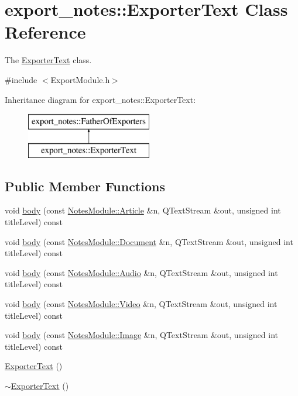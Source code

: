 \hypertarget{classexport__notes_1_1_exporter_text}{\section{export\-\_\-notes\-:\-:Exporter\-Text Class Reference}
\label{classexport__notes_1_1_exporter_text}
}


The \hyperlink{classexport__notes_1_1_exporter_text}{Exporter\-Text} class.  




{\ttfamily \#include $<$Export\-Module.\-h$>$}

Inheritance diagram for export\-\_\-notes\-:\-:Exporter\-Text\-:\begin{figure}[H]
\begin{center}
\leavevmode
\includegraphics[height=2.000000cm]{classexport__notes_1_1_exporter_text}
\end{center}
\end{figure}
\subsection*{Public Member Functions}
\begin{DoxyCompactItemize}
\item 
void \hyperlink{classexport__notes_1_1_exporter_text_a1d486f2dfcae0be28bde9f09038c731b}{body} (const \hyperlink{class_notes_module_1_1_article}{Notes\-Module\-::\-Article} \&n, Q\-Text\-Stream \&out, unsigned int title\-Level) const 
\item 
void \hyperlink{classexport__notes_1_1_exporter_text_a1391dd490d0dc8383579a2b5bcb5ff5a}{body} (const \hyperlink{class_notes_module_1_1_document}{Notes\-Module\-::\-Document} \&n, Q\-Text\-Stream \&out, unsigned int title\-Level) const 
\item 
void \hyperlink{classexport__notes_1_1_exporter_text_a3d39dbf72632b3bde0dd71838e0839bc}{body} (const \hyperlink{class_notes_module_1_1_audio}{Notes\-Module\-::\-Audio} \&n, Q\-Text\-Stream \&out, unsigned int title\-Level) const 
\item 
void \hyperlink{classexport__notes_1_1_exporter_text_a1ce83641a4c40361d7c2abaa420b6ac8}{body} (const \hyperlink{class_notes_module_1_1_video}{Notes\-Module\-::\-Video} \&n, Q\-Text\-Stream \&out, unsigned int title\-Level) const 
\item 
void \hyperlink{classexport__notes_1_1_exporter_text_a4ac920498bf9c86bba467dc11b2ad7c0}{body} (const \hyperlink{class_notes_module_1_1_image}{Notes\-Module\-::\-Image} \&n, Q\-Text\-Stream \&out, unsigned int title\-Level) const 
\item 
\hyperlink{classexport__notes_1_1_exporter_text_a7600edb782c29a70a37179314cc64062}{Exporter\-Text} ()
\item 
\hyperlink{classexport__notes_1_1_exporter_text_adf80b9a7b9b175f0fa679a66d05a9eb9}{$\sim$\-Exporter\-Text} ()
\end{DoxyCompactItemize}


